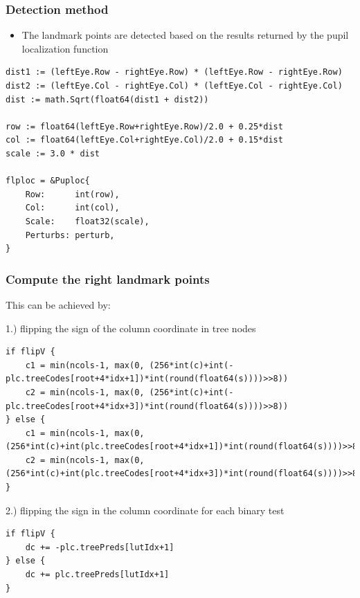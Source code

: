 \documentclass[9pt]{beamer}
\begin{document}
\begin{frame}[fragile]
\frametitle{Detection method}


\begin{itemize}
\item The landmark points are detected based on the results returned by the pupil localization function
\end{itemize}


\begin{verbatim}
dist1 := (leftEye.Row - rightEye.Row) * (leftEye.Row - rightEye.Row)
dist2 := (leftEye.Col - rightEye.Col) * (leftEye.Col - rightEye.Col)
dist := math.Sqrt(float64(dist1 + dist2))

row := float64(leftEye.Row+rightEye.Row)/2.0 + 0.25*dist
col := float64(leftEye.Col+rightEye.Col)/2.0 + 0.15*dist
scale := 3.0 * dist

flploc = &Puploc{
    Row:      int(row),
    Col:      int(col),
    Scale:    float32(scale),
    Perturbs: perturb,
}

\end{verbatim}



\end{frame}

\begin{frame}[fragile]
\frametitle{Compute the right landmark points}


This can be achieved by:


1.) flipping the sign of the column coordinate in tree nodes



\begin{verbatim}
if flipV {
    c1 = min(ncols-1, max(0, (256*int(c)+int(-plc.treeCodes[root+4*idx+1])*int(round(float64(s))))>>8))
    c2 = min(ncols-1, max(0, (256*int(c)+int(-plc.treeCodes[root+4*idx+3])*int(round(float64(s))))>>8))
} else {
    c1 = min(ncols-1, max(0, (256*int(c)+int(plc.treeCodes[root+4*idx+1])*int(round(float64(s))))>>8))
    c2 = min(ncols-1, max(0, (256*int(c)+int(plc.treeCodes[root+4*idx+3])*int(round(float64(s))))>>8))
}

\end{verbatim}


2.) flipping the sign in the column coordinate for each binary test



\begin{verbatim}
if flipV {
    dc += -plc.treePreds[lutIdx+1]
} else {
    dc += plc.treePreds[lutIdx+1]
}

\end{verbatim}



\end{frame}
\end{document}
